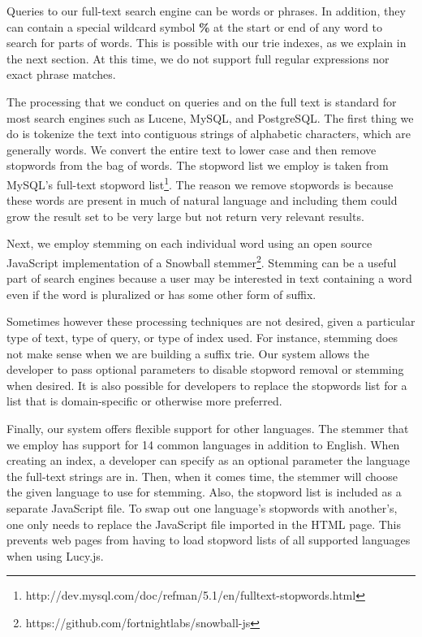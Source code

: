 \documentclass{vldb}
\begin{document}
Queries to our full-text search engine can be words or phrases. In addition, they can contain a special wildcard symbol \textbf{\%} at the start or end of any word to search for parts of words. This is possible with our trie indexes, as we explain in the next section. At this time, we do not support full regular expressions nor exact phrase matches.

The processing that we conduct on queries and on the full text is standard for most search engines such as Lucene, MySQL, and PostgreSQL. The first thing we do is tokenize the text into contiguous strings of alphabetic characters, which are generally words. We convert the entire text to lower case and then remove stopwords from the bag of words. The stopword list we employ is taken from MySQL's full-text stopword list\footnote{http://dev.mysql.com/doc/refman/5.1/en/fulltext-stopwords.html}. The reason we remove stopwords is because these words are present in much of natural language and including them could grow the result set to be very large but not return very relevant results.

Next, we employ stemming on each individual word using an open source JavaScript implementation of a Snowball stemmer\footnote{https://github.com/fortnightlabs/snowball-js}. 
Stemming can be a useful part of search engines because a user may be interested in text containing a word even if the word is pluralized or has some other form of suffix.

Sometimes however these processing techniques are not desired, given a particular type of text, type of query, or type of index used. For instance, stemming does not make sense when we are building a suffix trie. Our system allows the developer to pass optional parameters to disable stopword removal or stemming when desired. It is also possible for developers to replace the stopwords list for a list that is domain-specific or otherwise more preferred.

Finally, our system offers flexible support for other languages. The stemmer that we employ has support for 14 common languages in addition to English. When creating an index, a developer can specify as an optional parameter the language the full-text strings are in. Then, when it comes time, the stemmer will choose the given language to use for stemming.
Also, the stopword list is included as a separate JavaScript file. To swap out one language's stopwords with another's, one only needs to replace the JavaScript file imported in the HTML page. This prevents web pages from having to load stopword lists of all supported languages when using Lucy.js. 
\end{document}
